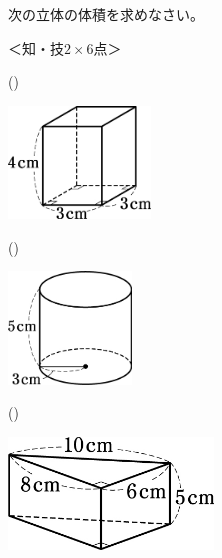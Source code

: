 \documentclass[
  12pt,a4paper,lualatex,ja=standard]{bxjsarticle}
\begin{document}
\begin{flushleft}
\begin{multicols}{2}
\begin{center}
\end{center}

\end{multicols}

\vfill
\newpage

\setcounter{skaunta}{0}
\noindent{} \hspace{1pt}次の立体の体積を求めなさい。

%
\begin{flushright}%
\footnotesize{＜知・技$2 \times 6$点＞}%
\end{flushright}%


\begin{multicols}{3}

()\hspace{2.5pt}

\begin{center}
\def\@captype{figure}
\includegraphics[height=30mm]{img/img7.jpg}

\end{center}

\columnbreak

()\hspace{2.5pt}

\begin{center}
\def\@captype{figure}
\includegraphics[height=30mm]{img/img8.jpg}

\end{center}

\columnbreak

()\hspace{2.5pt}

\begin{center}
\def\@captype{figure}
\includegraphics[height=30mm]{img/img9.jpg}


\end{center}
\end{multicols}
\end{flushleft}
\end{document}
